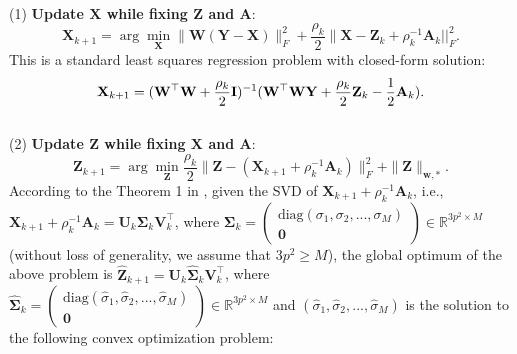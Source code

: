 \documentclass[10pt,twocolumn,letterpaper]{article}
\begin{document}
\vspace{2mm}
\\
(1) \textbf{Update $\mathbf{X}$ while fixing $\mathbf{Z}$ and $\mathbf{A}$}:
\vspace{-2mm}
\begin{equation}
\label{e12}
\mathbf{X}_{k+1}
=
\arg\min_{\mathbf{X}}
\|\mathbf{W}(\mathbf{Y}-\mathbf{X})\|_{F}^{2} 
+
\frac{\rho_{k}}{2}\|\mathbf{X} - \mathbf{Z}_{k} + \rho_{k}^{-1}\mathbf{A}_{k}||_{F}^{2}.
\end{equation}
This is a standard least squares regression problem with closed-form solution:
\vspace{-3mm}
\begin{equation}
\label{e13}
\vspace{-5mm}
\mathbf{X}_{k+1}
=
(\mathbf{W}^{\top}\mathbf{W}+\frac{\rho_{k}}{2}\mathbf{I})^{-1}
(\mathbf{W}^{\top}\mathbf{W}\mathbf{Y} + \frac{\rho_{k}}{2}\mathbf{Z}_{k} -\frac{1}{2}\mathbf{A}_{k}).
\end{equation}
\\
(2) \textbf{Update $\mathbf{Z}$ while fixing $\mathbf{X}$ and $\mathbf{A}$}:
\vspace{-3mm}
\begin{equation}
\label{e14}
\mathbf{Z}_{k+1}
=
\arg\min_{\mathbf{Z}}\frac{\rho_{k}}{2}
\|\mathbf{Z} - (\mathbf{X}_{k+1}+\rho_{k}^{-1}\mathbf{A}_{k})\|_{F}^{2}
+
\|\mathbf{Z}\|_{\bm{w},*}.
\end{equation}
According to the Theorem 1 in \cite{wnnmijcv}, given the SVD of $\mathbf{X}_{k+1}+\rho_{k}^{-1}\mathbf{A}_{k}$, i.e., $\mathbf{X}_{k+1}+\rho_{k}^{-1}\mathbf{A}_{k}=\mathbf{U}_{k}\mathbf{\Sigma}_{k}\mathbf{V}_{k}^{\top}$, where 
$\mathbf{\Sigma}_{k}=
\left( \begin{array}{c}
\text{diag}(\sigma_{1},\sigma_{2},...,\sigma_{M})
\\
\mathbf{0}
\end{array} \right)
\in\mathbb{R}^{3p^{2}\times M}$ (without loss of generality, we assume that $3p^{2}\ge M$),
the global optimum of the above problem is 
$\hat{\mathbf{Z}}_{k+1}=\mathbf{U}_{k}\hat{\mathbf{\Sigma}}_{k}\mathbf{V}_{k}^{\top}$, where 
$\hat{\mathbf{\Sigma}}_{k}=
\left( \begin{array}{c}
\text{diag}(\hat{\sigma}_{1},\hat{\sigma}_{2},...,\hat{\sigma}_{M})
\\
\mathbf{0}
\end{array} \right)
\in\mathbb{R}^{3p^{2}\times M}$
and $(\hat{\sigma}_{1},\hat{\sigma}_{2},...,\hat{\sigma}_{M})$ is the solution to the following convex optimization problem:
\end{document}
